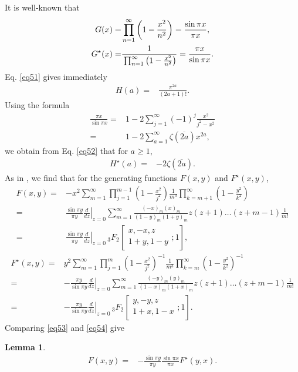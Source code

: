 \documentclass[reqno]{amsart}
\newtheorem{lemma}[theorem]{Lemma}
\theoremstyle{definition}
\theoremstyle{remark}
\numberwithin{equation}{section}
\begin{document}
It is well-known that
\begin{align}
G(x)=&\prod_{n=1}^{\infty}\left(1-\frac{x^2}{n^2}\right)=\frac{\sin\pi x}{\pi x},\label{eq51}\\
G^{\star}(x)=&\frac{1}{{\displaystyle}\prod_{n=1}^{\infty}\left(1-\frac{x^2}{n^2}\right)}=\frac{\pi x}{\sin \pi x}.\label{eq52}
\end{align}
Eq. \eqref{eq51} gives immediately
\begin{align*}
H(a)=&\frac{\pi^{2a}}{(2a+1)!}.
\end{align*}
Using the formula
\begin{align*}
\frac{\pi x}{\sin \pi x}=&1-2\sum_{j=1}^{\infty}(-1)^j\frac{x^2}{j^2-x^2}\\
=&1-2\sum_{a=1}^{\infty}\zeta(\overline{2a})x^{2a},
\end{align*}we obtain from Eq. \eqref{eq52} that for $a\geq 1$,
\begin{align}\label{eq56}
H^{\star}(a)=&-2\zeta(\overline{2a}).
\end{align}
As in \cite{1}, we find that for the generating functions $F(x, y)$ and $F^{\star}(x, y)$,
\begin{equation}\label{eq53}\begin{split}
F(x,y)
=&-x^2\sum_{m=1}^{\infty} \prod_{j=1}^{m-1}\left(1-\frac{x^2}{j^2}\right)\frac{1}{m^3}\prod_{k=m+1}^{\infty}\left(1-\frac{y^2}{k^2}\right)\\
=&\frac{\sin\pi y}{\pi y}\left.\frac{d}{dz}\right|_{z=0}\sum_{m=1}^{\infty} \frac{(-x)_m(x)_m}{(1-y)_m(1+y)_m}z(z+1)\ldots(z+m-1)\frac{1}{m!}\\
=&\frac{\sin\pi y}{\pi y}\left.\frac{d}{dz}\right|_{z=0}\,_3F_2\left[\begin{aligned} x,-x,z\quad\\1+y,1-y\end{aligned};1\right],
\end{split}\end{equation}
\begin{equation}\label{eq54}\begin{split}
F^{\star}(x,y)
=& y^2\sum_{m=1}^{\infty} \prod_{j=1}^{m}\left(1-\frac{x^2}{j^2}\right)^{-1}\frac{1}{m^3}\prod_{k=m}^{\infty}\left(1-\frac{y^2}{k^2}\right)^{-1}\\
=&-\frac{\pi y}{\sin\pi y} \left.\frac{d}{dz}\right|_{z=0}\sum_{m=1}^{\infty} \frac{(-y)_m(y)_m}{(1-x)_m(1+x)_m}z(z+1)\ldots(z+m-1)\frac{1}{m!}\\
=&-\frac{\pi y}{\sin\pi y} \left.\frac{d}{dz}\right|_{z=0}\,_3F_2\left[\begin{aligned} y,-y,z\quad\\1+x,1-x\end{aligned};1\right].
\end{split}\end{equation}
Comparing \eqref{eq53} and \eqref{eq54} give
\begin{lemma}\label{lemma10}
\begin{align*}
F(x,y)=&-\frac{\sin\pi y}{\pi y}\frac{\sin\pi x}{\pi x}F^{\star}(y, x).
\end{align*}
\end{lemma}
\end{document}
